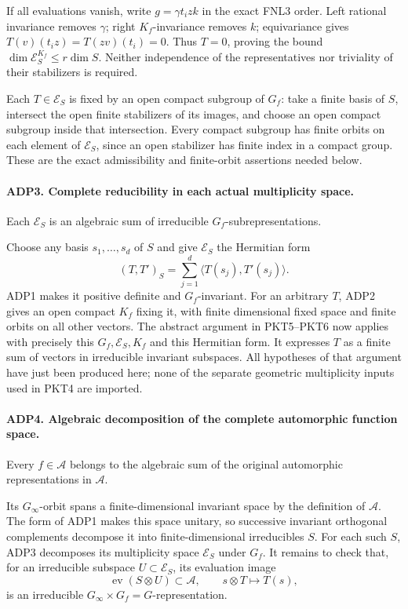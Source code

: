 If all evaluations vanish, write \(g=\gamma t_i z k\) in the exact
FNL3 order.  Left rational invariance removes \(\gamma\); right
\(K_f\)-invariance removes \(k\); equivariance gives
\(T(v)(t_i z)=T(zv)(t_i)=0\).  Thus \(T=0\), proving the bound
\(\dim\mathcal E_S^{K_f}\le r\dim S\).  Neither independence of the
representatives nor triviality of their stabilizers is required.

Each \(T\in\mathcal E_S\) is fixed by an open compact subgroup of
\(G_f\): take a finite basis of \(S\), intersect the open finite
stabilizers of its images, and choose an open compact subgroup inside
that intersection.  Every compact subgroup has finite orbits on each
element of \(\mathcal E_S\), since an open stabilizer has finite
index in a compact group.  These are the exact admissibility and
finite-orbit assertions needed below.

\paragraph{ADP3. Complete reducibility in each actual multiplicity space.}
\label{claim:ADP3}
Each \(\mathcal E_S\) is an algebraic sum of irreducible
\(G_f\)-subrepresentations.

Choose any basis \(s_1,\ldots,s_d\) of \(S\) and give
\(\mathcal E_S\) the Hermitian form
\[
       (T,T')_S=\sum_{j=1}^d
                         \langle T(s_j),T'(s_j)\rangle.
\]
ADP1 makes it positive definite and \(G_f\)-invariant.  For an arbitrary
\(T\), ADP2 gives an open compact \(K_f\) fixing it, with finite
dimensional fixed space and finite orbits on all other vectors.  The
abstract argument in PKT5--PKT6 now applies with precisely this
\(G_f,\mathcal E_S,K_f\) and this Hermitian form.  It expresses
\(T\) as a finite sum of vectors in irreducible invariant subspaces.
All hypotheses of that argument have just been produced here; none of
the separate geometric multiplicity inputs used in PKT4 are imported.

\paragraph{ADP4. Algebraic decomposition of the complete automorphic function space.}
\label{claim:ADP4}
Every \(f\in\mathcal A\) belongs to the algebraic sum of the original
automorphic representations in \(\mathcal A\).

Its \(G_\infty\)-orbit spans a finite-dimensional invariant space by
the definition of \(\mathcal A\).  The form of ADP1 makes this space
unitary, so successive invariant orthogonal complements decompose it
into finite-dimensional irreducibles \(S\).  For each such \(S\),
ADP3 decomposes its multiplicity space \(\mathcal E_S\) under \(G_f\).
It remains to check that, for an irreducible subspace
\(U\subset\mathcal E_S\), its evaluation image
\[
       \operatorname{ev}(S\otimes U)\subset\mathcal A,
          \qquad s\otimes T\longmapsto T(s),
\]
is an irreducible \(G_\infty\times G_f=G\)-representation.

